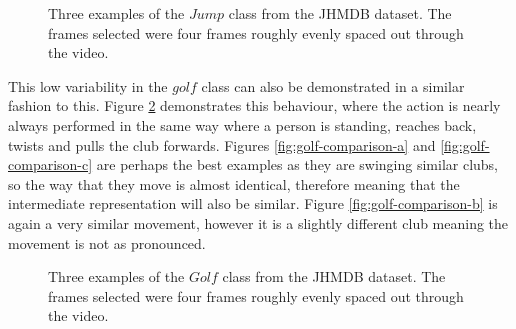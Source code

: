 \begin{figure}[ht]
	\centering
	\caption{Three examples of the $Jump$ class from the JHMDB dataset. The frames selected were four frames roughly evenly spaced out through the video.}
	\label{fig:jump-comparison}
\end{figure}

This low variability in the $golf$ class can also be demonstrated in a similar fashion to this. Figure \ref{fig:golf-comparison} demonstrates this behaviour, where the action is nearly always performed in the same way where a person is standing, reaches back, twists and pulls the club forwards. Figures \ref{fig:golf-comparison-a} and \ref{fig:golf-comparison-c} are perhaps the best examples as they are swinging similar clubs, so the way that they move is almost identical, therefore meaning that the intermediate representation will also be similar. Figure \ref{fig:golf-comparison-b} is again a very similar movement, however it is a slightly different club meaning the movement is not as pronounced. 

\begin{figure}[ht]
	\centering
	\caption{Three examples of the $Golf$ class from the JHMDB dataset. The frames selected were four frames roughly evenly spaced out through the video.}
	\label{fig:golf-comparison}
\end{figure}



